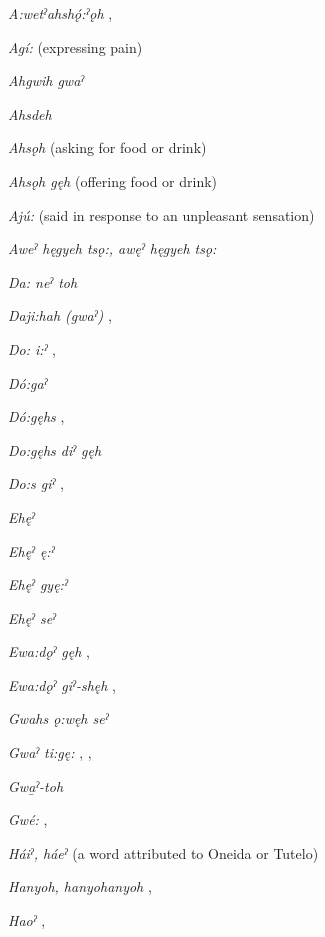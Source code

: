 \begin{multicols}{2}

\textit{A:wetˀahshǫ́:ˀǫh} , 

\textit{Agí:}  (expressing pain)

\textit{Ahgwih gwaˀ} 

\textit{Ahsdeh} 

\textit{Ahsǫh}  (asking for food or drink)

\textit{Ahsǫh gęh}  (offering food or drink)

\textit{Ajú:}  (said in response to an unpleasant sensation)

\textit{Aweˀ hęgyeh tsǫ:, awęˀ hęgyeh tsǫ:} 

\textit{Da: neˀ toh} 

\textit{Daji:hah (gwaˀ)} , 

\textit{Do: i:ˀ} , 

\textit{Dó:gaˀ} 

\textit{Dó:gęhs} , 

\textit{Do:gęhs diˀ gęh} 

\textit{Do:s giˀ} , 

\textit{Ehęˀ} 

\textit{Ehęˀ ę:ˀ} 

\textit{Ehęˀ gyę:ˀ} 

\textit{Ehęˀ seˀ} 

\textit{Ewa:dǫˀ gęh} , 

\textit{Ewa:dǫˀ giˀ-shęh} , 

\textit{Gwahs ǫ:węh seˀ} 

\textit{Gwaˀ ti:gę:} , , 

\textit{Gwa̱ˀ-toh} 

\textit{Gwé:} , 

\textit{Háiˀ, háeˀ}  (a word attributed to Oneida or Tutelo)

\textit{Hanyoh, hanyohanyoh} , 

\textit{Haoˀ} , 


\end{multicols}

